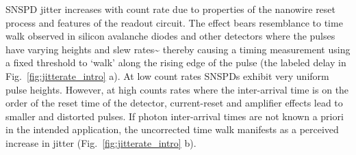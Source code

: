 \documentclass[11pt]{caltech_thesis} %
\begin{document}
SNSPD jitter increases with count rate due to properties of the nanowire
reset process and features of the readout circuit. The effect bears
resemblance to time walk observed in silicon avalanche diodes and other
detectors where the pulses have varying heights and slew
rates\textasciitilde{}\autocite{SPAD_walk_Kirchnir_1997} thereby causing
a timing measurement using a fixed threshold to `walk' along the rising
edge of the pulse (the labeled delay in Fig.~\ref{fig:jitterate_intro}
a). At low count rates SNSPDs exhibit very uniform pulse heights.
However, at high counts rates where the inter-arrival time is on the
order of the reset time of the detector, current-reset and amplifier
effects lead to smaller and distorted pulses. If photon inter-arrival
times are not known a priori in the intended application, the
uncorrected time walk manifests as a perceived increase in jitter
(Fig.~\ref{fig:jitterate_intro} b).
\end{document}
